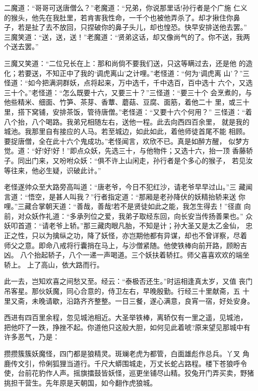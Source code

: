 二魔道：“哥哥可送唐僧么？”老魔道：“兄弟，你说那里话!孙行者是个广施
仁义的猴头，他先在我肚里，若肯害我性命，一千个也被他弄杀了。却才揪住你鼻
子，若是扯了去不放回，只捏破你的鼻子头儿，却也惶恐。快早安排送他去罢。”
三魔笑道：“送，送，送！”老魔道：“贤弟这话，却又像尚气的了。你不送，我两
个送去罢。”

三魔又笑道：“二位兄长在上：那和尚倘不要我们送，只这等瞒过去，还是他
的造化；若要送，不知正中了我的‘调虎离山’之计哩。”老怪道：“何为‘调虎离
山’？”三怪道：“如今把满洞群妖，点将起来，万中选千，千中选百，百中选十
六个，又选三十个。”老怪道：“怎么既要十六，又要三十？”三怪道：“要三十个
会烹煮的，与他些精米、细面、竹笋、茶芽、香蕈、蘑菇、豆腐、面筋，着他二十
里，或三十里，搭下窝铺，安排茶饭，管待唐僧。”老怪道：“又要十六个何用？”
三怪道：“着八个抬，八个喝路。我弟兄相随左右，送他一程。此去向西四百余里，
就是我的城池。我那里自有接应的人马。若至城边，如此如此，着他师徒首尾不能
相顾。要捉唐僧，全在此十六个鬼成功。”老怪闻言，欢欣不已。真是如醉方醒，
似梦方觉。道：“好!好!好！”即点众妖，先选三十，与他物件；又选十六，抬一顶
香藤轿子。同出门来，又吩咐众妖：“俱不许上山闲走，孙行者是个多心的猴子，
若见汝等往来，他必生疑，识破此计。”

老怪遂帅众至大路旁高叫道：“唐老爷，今日不犯红沙，请老爷早早过山。”三
藏闻言道：“悟空，是甚人叫我？”行者指定道：“那厢是老孙降伏的妖精抬轿来送
你哩。”三藏合掌朝天道：“善哉，善哉!若不是贤徒如此之能，我怎生得去！”径直
向前，对众妖作礼道：“多承列位之爱，我弟子取经东回，向长安当传扬善果也。”
众妖叩首道：“请老爷上轿。”那三藏肉眼凡胎，不知是计；孙大圣又是太乙金仙，
忠正之性，只以为擒纵之功，降了妖怪，亦岂期他都有异谋，却也不曾详察，尽着
师父之意。即命八戒将行囊捎在马上，与沙僧紧随。他使铁棒向前开路，顾盼吉凶。
八个抬起轿子，八个一递一声喝道。三个妖扶着轿扛。师父喜喜欢欢的端坐轿上。
上了高山，依大路而行。

此一去，岂知欢喜之间愁又至。经云：“泰极否还生。”时运相逢真太岁，又值
丧门吊客星。那伙妖魔，同心合意的，侍卫左右，早晚殷勤。行经三十里献斋，五
十里又斋，未晚请歇，沿路齐齐整整。一日三餐，遂心满意，良宵一宿，好处安身。

西进有四百里余程，忽见城池相近。大圣举铁棒，离轿仅有一里之遥，见城池，
把他吓了一跌，挣挫不起。你道他只这般大胆，如何见此着唬?原来望见那城中有
许多恶气，乃是：

攒攒簇簇妖魔怪，四门都是狼精灵。斑斓老虎为都管，白面雄彪作总兵。丫叉
角鹿传文引，伶俐狐狸当道行。千尺大蟒围城走，万丈长蛇占路程。楼下苍狼呼令
使，台前花豹作人声。摇旗擂鼓皆妖怪，巡更坐铺尽山精。狡兔开门弄买卖，野猪
挑担干营生。先年原是天朝国，如今翻作虎狼城。

